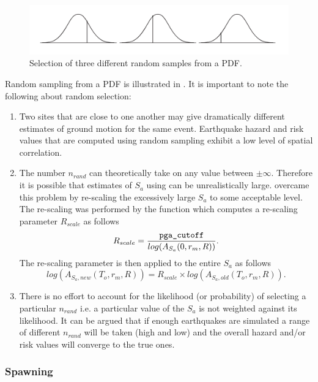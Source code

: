 \begin{figure}
\includegraphics[width=1\textwidth]{diags/fig-hattn-random}
\caption{Selection of three different random samples from a PDF.}
\label{fig:hattn-randomsamp}
\end{figure}
Random sampling from a PDF is illustrated in
. It is important to note the following
about random selection:
\begin{enumerate}
\item Two sites that are close to one another may give
dramatically different estimates of ground motion for the same
event. Earthquake hazard and risk values that are computed using
random sampling exhibit a low level of spatial correlation. \item
The number $n_{rand}$ can theoretically take on any value between
$\pm \infty$. Therefore it is possible that estimates of $S_a$ using
 can be unrealistically large. \cite{dr_Dhu02b}
overcame this problem by re-scaling the excessively large $S_a$ to
some acceptable level. The re-scaling was performed by the function
 which computes a re-scaling parameter
$R_{scale}$ as follows
\begin{equation}
R_{scale} =
\frac{\textrm{\typepar{pga}{\_cut}{off}}}{log(A_{S_a}(0,r_m,R))}.
\end{equation}
The re-scaling parameter is then applied to the entire $S_a$ as
follows
\begin{equation}
log(A_{S_a,new}(T_o,r_m,R)) = R_{scale} \times
log(A_{S_a,old}(T_o,r_m,R)).
\end{equation}
\item There is no effort to account for the likelihood (or
probability) of selecting a particular $n_{rand}$ i.e. a particular
value of the $S_a$ is not weighted against its likelihood. It can be
argued that if enough earthquakes are simulated a range of different
$n_{rand}$ will be taken (high and low) and the overall hazard
and/or risk values will converge to the true ones.
\end{enumerate}


\subsubsection{Spawning
} \label{attn:uncert-pdfchoice}


